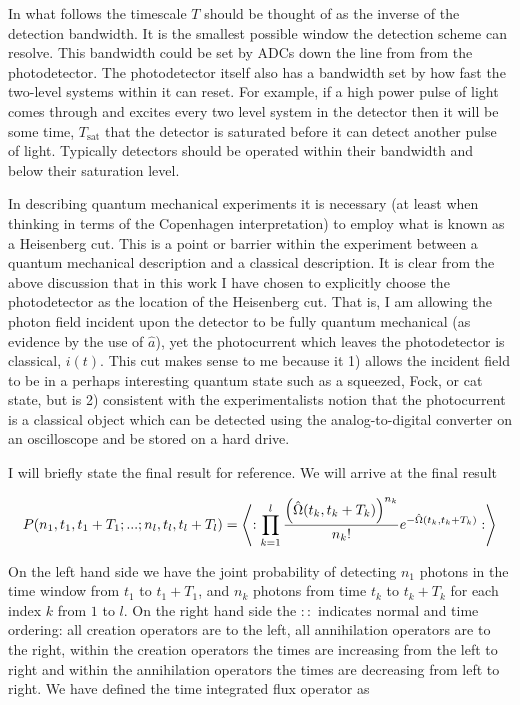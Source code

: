 \documentclass[12pt]{article}
\begin{document}
In what follows the timescale $T$ should be thought of as the inverse of the detection bandwidth. It is the smallest possible window the detection scheme can resolve. This bandwidth could be set by ADCs down the line from from the photodetector. The photodetector itself also has a bandwidth set by how fast the two-level systems within it can reset. For example, if a high power pulse of light comes through and excites every two level system in the detector then it will be some time, $T_{\text{sat}}$ that the detector is saturated before it can detect another pulse of light. Typically detectors should be operated within their bandwidth and below their saturation level.

In describing quantum mechanical experiments it is necessary (at least when thinking in terms of the Copenhagen interpretation) to employ what is known as a Heisenberg cut. This is a point or barrier within the experiment between a quantum mechanical description and a classical description. It is clear from the above discussion that in this work I have chosen to explicitly choose the photodetector as the location of the Heisenberg cut. That is, I am allowing the photon field incident upon the detector to be fully quantum mechanical (as evidence by the use of $\hat{a}$), yet the photocurrent which leaves the photodetector is classical, $i(t)$. This cut makes sense to me because it 1) allows the incident field to be in a perhaps interesting quantum state such as a squeezed, Fock, or cat state, but is 2) consistent with the experimentalists notion that the photocurrent is a classical object which can be detected using the analog-to-digital converter on an oscilloscope and be stored on a hard drive.

I will briefly state the final result for reference. We will arrive at the final result

\begin{align}
P(n_1,t_1,t_1+T_1;...;n_l,t_l,t_l+T_l) = \Braket{:\prod_{k=1}^l \frac{\left(\hat{\Omega}(t_k,t_k+T_k)\right)^{n_k}}{n_k!} e^{-\hat{\Omega}(t_k,t_k+T_k)}:}
\end{align}

On the left hand side we have the joint probability of detecting $n_1$ photons in the time window from $t_1$ to $t_1 + T_1$, and $n_k$ photons from time $t_k$ to $t_k+T_k$ for each index $k$ from $1$ to $l$. On the right hand side the $::$ indicates normal and time ordering: all creation operators are to the left, all annihilation operators are to the right, within the creation operators the times are increasing from the left to right and within the annihilation operators the times are decreasing from left to right.
We have defined the time integrated flux operator as
\end{document}
